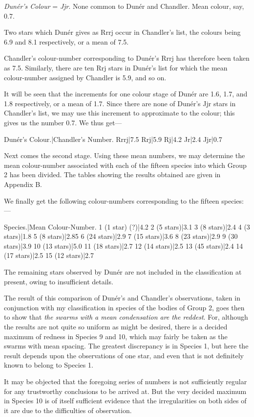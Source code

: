 \documentclass[a4paper, 12pt, oneside, polutonikogreek, english]{article}
\begin{document}
\emph{Dunér's Colour} = \emph{Jjr}. 
None common to Dunér and Chandler. 
Mean colour, say, 0.7. 

Two stars which Dunér gives as Rrrj occur in Chandler's list, the colours being 6.9 and 8.1 respectively, or a mean of 7.5.

Chandler's colour-number corresponding to Dunér's Rrrj has therefore been taken as 7.5. Similarly, there are ten Rrj stars in Dunér's list for which the mean colour-number assigned by Chandler is 5.9, and so on.

It will be seen that the increments for one colour stage of Dunér are 1.6, 1.7, and 1.8 respectively, or a mean of 1.7. Since there are none of Dunér's Jjr stars in Chandler's list, we may use this increment to approximate to the colour; this gives us the number 0.7. We thus get---

Dunér's Colour.|Chandler's Number. 
Rrrj|7.5 
Rrj|5.9 
Rj|4.2 
Jr|2.4 
Jjr|0.7

Next comes the second stage. Using these mean numbers, we may determine the mean colour-number associated with each of the fifteen species into which Group 2 has been divided. The tables showing the results obtained are given in Appendix B.

We finally get the following colour-numbers corresponding to the fifteen species:---

Species.|Mean Colour-Number. 
1 (1 star) (?)|4.2 
2 (5 stars)|3.1 
3 (8 stars)|2.4 
4 (3 stars)|1.8 
5 (8 stars)|2.85 
6 (24 stars)|2.9 
7 (15 stars)|3.6 
8 (23 stars)|2.9 
9 (30 stars)|3.9 
10 (13 stars)|5.0 
11 (18 stars)|2.7 
12 (14 stars)|2.5 
13 (45 stars)|2.4 
14 (17 stars)|2.5 
15 (12 stars)|2.7 

The remaining stars observed by Dunér are not included in the classification at present, owing to insufficient details.

The result of this comparison of Dunér's and Chandler's observations, taken in conjunction with my classification in species of the bodies of Group 2, goes then to show that \emph{the swarms with a mean condensation are the reddest}. For, although the results are not quite so uniform as might be desired, there is a decided maximum of redness in Species 9 and 10, which may fairly be taken as the swarms with mean spacing. The greatest discrepancy is in Species 1, but here the result depends upon the observations of one star, and even that is not definitely known to belong to Species 1.

It may be objected that the foregoing series of numbers is not sufficiently regular for any trustworthy conclusions to be arrived at. But the very decided maximum in Species 10 is of itself sufficient evidence that the irregularities on both sides of it are due to the difficulties of observation.
\end{document}
